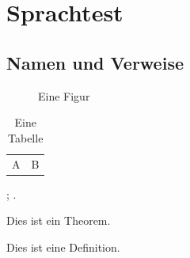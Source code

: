 \documentclass[de, font = none, mode = simple]{elegantbook-l3}
\begin{document}
\frontmatter
\tableofcontents

\mainmatter
\chapter{Sprachtest}
\section{Namen und Verweise}

\begin{figure}[htbp]
  \centering
  \fbox{\rule{0pt}{2cm}\rule{3cm}{0pt}}
  \caption{Eine Figur}\label{fig:language-test}
\end{figure}

\begin{table}[htbp]
  \centering
  \caption{Eine Tabelle}\label{tab:language-test}
  \begin{tabular}{cc}
    A & B
  \end{tabular}
\end{table}

; .

\begin{theorem}[Beispiel]
  Dies ist ein Theorem.
\end{theorem}

\begin{definition}
  Dies ist eine Definition.
\end{definition}
\end{document}
